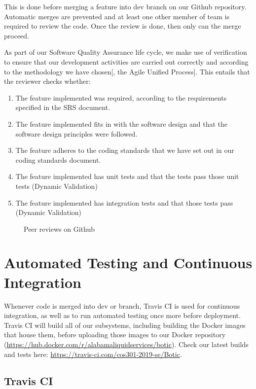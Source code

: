 \documentclass[11pt]{article}
\begin{document}
This is done before merging a feature into dev branch on our Github repository. Automatic merges are prevented and at least one other member of team is required to review the code. Once the review is done, then only can the merge proceed. \par
As part of our Software Quality Assurance life cycle, we make use of verification\cite{Book:1} to ensure that our development activities are carried out correctly and according to the methodology we have chosen[, the Agile Unified Process]. This entails that the reviewer checks whether:
\begin{enumerate}[label=-]
	\item The feature implemented was required, according to the requirements specified in the SRS document.
	\item The feature implemented fits in with the software design and that the software design principles were followed.
	\item The feature adheres to the coding standards that we have set out in our coding standards document.
	\item The feature implemented has unit tests and that the tests pass those unit tests (Dynamic Validation)
	\item The feature implemented has integration tests and that those tests pass (Dynamic Validation)
\end{enumerate}
\par

\begin{figure}[H]
	\centering
	\caption{Peer reviews on Github}
\end{figure}

\section{Automated Testing and Continuous Integration}

Whenever code is merged into dev or branch, Travis CI is used for continuous integration, as well as to run automated testing once more before deployment. Travis CI will build all of our subsystems, including building the Docker images that house them, before uploading those images to our Docker repository (\url{https://hub.docker.com/r/alabamaliquidservices/botic}). Check our latest builds and tests here: \url{https://travis-ci.com/cos301-2019-se/Botic}.

\subsection{Travis CI}
\end{document}
